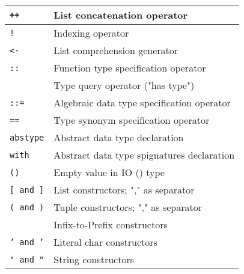 \documentclass[]{article}
\begin{document}
\begin{tabular}{ | l | l | }
	\texttt{++}						& List concatenation operator						\\ \hline
	\texttt{!}						& Indexing operator									\\ \hline
	\texttt{<-}						& List comprehension generator						\\ \hline
	\hline
	\texttt{::}						& Function type specification operator				\\ 
									& Type query operator ("has type")					\\ \hline
	\texttt{::=}					& Algebraic data type specification operator		\\ \hline
	\texttt{==}						& Type synonym specification operator				\\ \hline
	\texttt{abstype}				& Abstract data type declaration					\\ \hline
	\texttt{with}					& Abstract data type spignatures declaration		\\ \hline
	\texttt{()}						& Empty value in IO () type							\\ \hline
	\hline
	\texttt{[ and ]}				& List constructors; "," as separator				\\ \hline
	\texttt{( and )}				& Tuple constructors; "," as separator				\\ 
									& Infix-to-Prefix constructors						\\ \hline
	\texttt{' and '}				& Literal char constructors							\\ \hline
	\texttt{" and "}				& String constructors								\\ \hline
\end{tabular}
\end{document}
